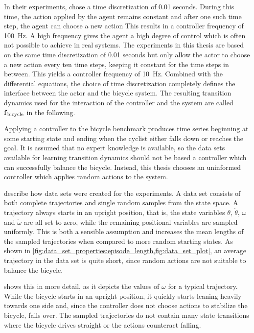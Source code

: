 In their experiments, \citeauthor{randlov_learning_1998} chose a time discretization of 0.01 seconds.
During this time, the action applied by the agent remains constant and after one such time step, the agent can choose a new action
This results in a controller frequency of \SI[mode=text]{100}{\Hz}.
A high frequency gives the agent a high degree of control which is often not possible to achieve in real systems.
The experiments in this thesis are based on the same time discretization of 0.01 seconds but only allow the actor to choose a new action every ten time steps, keeping it constant for the time steps in between.
This yields a controller frequency of \SI[mode=text]{10}{\Hz}.
Combined with the differential equations, the choice of time discretization completely defines the interface between the actor and the bicycle system.
The resulting transition dynamics used for the interaction of the controller and the system are called $\operatorname{\operatorname{\mathbf{f}}_{\text{bicycle}}}$ in the following.

Applying a controller to the bicycle benchmark produces time series beginning at some starting state and ending when the cyclist either falls down or reaches the goal.
It is assumed that no expert knowledge is available, so the data sets available for learning transition dynamics should not be based a controller which can successfully balance the bicycle.
Instead, this thesis chooses an uninformed controller which applies random actions to the system.

 describe how data sets were created for the experiments.
A data set consists of both complete trajectories and single random samples from the state space.
A trajectory always starts in an upright position, that is, the state variables $\theta$, $\dot{\theta}$, $\omega$ and $\dot{\omega}$ are all set to zero, while the remaining positional variables are sampled uniformly.
This is both a sensible assumption and increases the mean lengths of the sampled trajectories when compared to more random starting states.
As shown in \cref{fig:data_set_properties:episode_length,fig:data_set_plot}, an average trajectory in the data set is quite short, since random actions are not suitable to balance the bicycle.

 shows this in more detail, as it depicts the values of $\omega$ for a typical trajectory.
While the bicycle starts in an upright position, it quickly starts leaning heavily towards one side and, since the controller does not choose actions to stabilize the bicycle, falls over.
The sampled trajectories do not contain many state transitions where the bicycle drives straight or the actions counteract falling.

